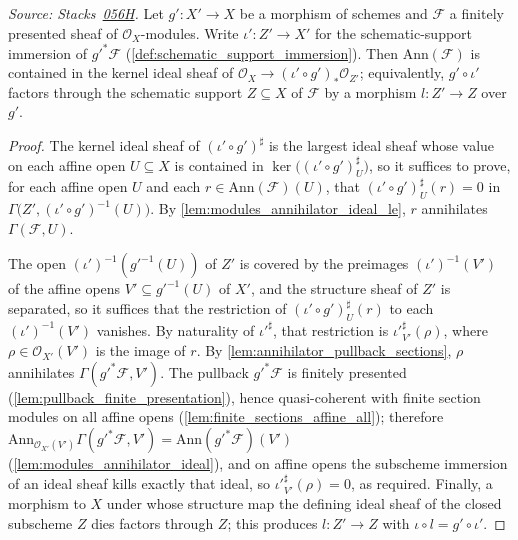 \begin{lemma}
  \label{lem:annihilator_le_map_pullback}
  \textit{Source:
  Stacks~\href{https://stacks.math.columbia.edu/tag/056H}{056H}.}
  Let \(g' : X' \to X\) be a morphism of schemes and \(\mathcal{F}\) a
  finitely presented sheaf of \(\mathcal{O}_X\)-modules.  Write
  \(\iota' : Z' \to X'\) for the schematic-support immersion of
  \(g'^* \mathcal{F}\) (\cref{def:schematic_support_immersion}).  Then
  \(\mathrm{Ann}(\mathcal{F})\) is contained in the kernel ideal sheaf of
  \(\mathcal{O}_X \to (\iota' \circ g')_* \mathcal{O}_{Z'}\); equivalently,
  \(g' \circ \iota'\) factors through the schematic support
  \(Z \subseteq X\) of \(\mathcal{F}\) by a morphism \(l : Z' \to Z\) over
  \(g'\).
\end{lemma}
\begin{proof}\leanok
  The kernel ideal sheaf of \((\iota' \circ g')^\sharp\) is the largest ideal
  sheaf whose value on each affine open \(U \subseteq X\) is contained in
  \(\ker\bigl((\iota' \circ g')^\sharp_U\bigr)\), so it suffices to prove,
  for each affine open \(U\) and each \(r \in \mathrm{Ann}(\mathcal{F})(U)\),
  that \((\iota' \circ g')^\sharp_U(r) = 0\) in
  \(\Gamma\bigl(Z', (\iota' \circ g')^{-1}(U)\bigr)\).  By
  \cref{lem:modules_annihilator_ideal_le}, \(r\) annihilates
  \(\Gamma(\mathcal{F}, U)\).

  The open \((\iota')^{-1}(g'^{-1}(U))\) of \(Z'\) is covered by the
  preimages \((\iota')^{-1}(V')\) of the affine opens
  \(V' \subseteq g'^{-1}(U)\) of \(X'\), and the structure sheaf of \(Z'\) is
  separated, so it suffices that the restriction of
  \((\iota' \circ g')^\sharp_U(r)\) to each \((\iota')^{-1}(V')\) vanishes.
  By naturality of \(\iota'^\sharp\), that restriction is
  \(\iota'^\sharp_{V'}(\rho)\), where \(\rho \in \mathcal{O}_{X'}(V')\) is the
  image of \(r\).  By \cref{lem:annihilator_pullback_sections}, \(\rho\)
  annihilates \(\Gamma(g'^* \mathcal{F}, V')\).  The pullback
  \(g'^* \mathcal{F}\) is finitely presented
  (\cref{lem:pullback_finite_presentation}), hence quasi-coherent with finite
  section modules on all affine opens
  (\cref{lem:finite_sections_affine_all}); therefore
  \(\mathrm{Ann}_{\mathcal{O}_{X'}(V')}\Gamma(g'^* \mathcal{F}, V')
  = \mathrm{Ann}(g'^* \mathcal{F})(V')\)
  (\cref{lem:modules_annihilator_ideal}), and on affine opens the subscheme
  immersion of an ideal sheaf kills exactly that ideal, so
  \(\iota'^\sharp_{V'}(\rho) = 0\), as required.  Finally, a morphism to
  \(X\) under whose structure map the defining ideal sheaf of the closed
  subscheme \(Z\) dies factors through \(Z\); this produces \(l : Z' \to Z\)
  with \(\iota \circ l = g' \circ \iota'\).
\end{proof}

